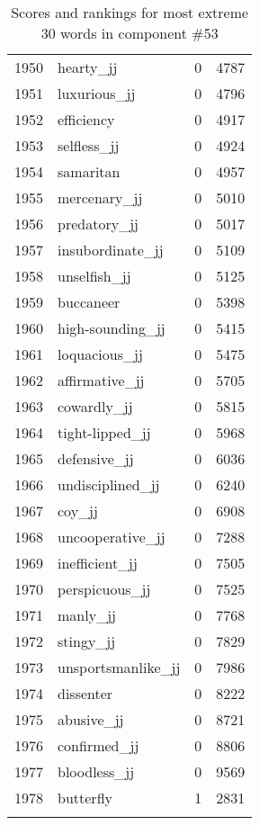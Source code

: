 \begin{longtable}[!htbp]{| rlr@{.}l |}
    1950 & hearty\_jj & 0 & 4787 \\
    1951 & luxurious\_jj & 0 & 4796 \\
    1952 & efficiency & 0 & 4917 \\
    1953 & selfless\_jj & 0 & 4924 \\
    1954 & samaritan & 0 & 4957 \\
    1955 & mercenary\_jj & 0 & 5010 \\
    1956 & predatory\_jj & 0 & 5017 \\
    1957 & insubordinate\_jj & 0 & 5109 \\
    1958 & unselfish\_jj & 0 & 5125 \\
    1959 & buccaneer & 0 & 5398 \\
    1960 & high-sounding\_jj & 0 & 5415 \\
    1961 & loquacious\_jj & 0 & 5475 \\
    1962 & affirmative\_jj & 0 & 5705 \\
    1963 & cowardly\_jj & 0 & 5815 \\
    1964 & tight-lipped\_jj & 0 & 5968 \\
    1965 & defensive\_jj & 0 & 6036 \\
    1966 & undisciplined\_jj & 0 & 6240 \\
    1967 & coy\_jj & 0 & 6908 \\
    1968 & uncooperative\_jj & 0 & 7288 \\
    1969 & inefficient\_jj & 0 & 7505 \\
    1970 & perspicuous\_jj & 0 & 7525 \\
    1971 & manly\_jj & 0 & 7768 \\
    1972 & stingy\_jj & 0 & 7829 \\
    1973 & unsportsmanlike\_jj & 0 & 7986 \\
    1974 & dissenter & 0 & 8222 \\
    1975 & abusive\_jj & 0 & 8721 \\
    1976 & confirmed\_jj & 0 & 8806 \\
    1977 & bloodless\_jj & 0 & 9569 \\
    1978 & butterfly & 1 & 2831 \\
    \hline
    \caption{Scores and rankings for most extreme 30 words in component \#53} \\
\end{longtable}
